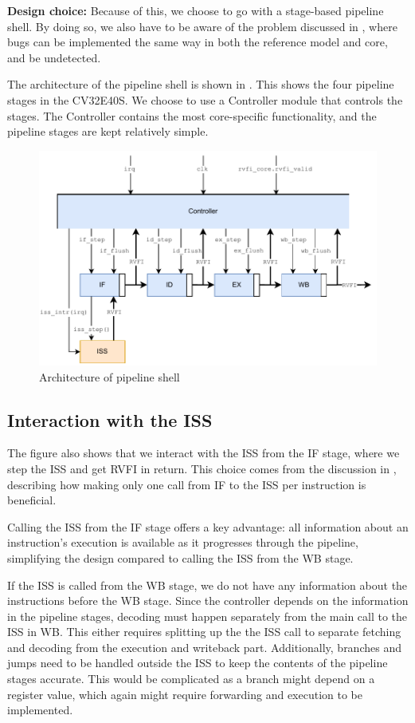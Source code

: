 \textbf{Design choice:} Because of this, we choose to go with a stage-based pipeline shell. By doing so, we also have to be aware of the problem discussed in , where bugs can be implemented the same way in both the reference model and core, and be undetected.

The architecture of the pipeline shell is shown in . This shows the four pipeline stages in the CV32E40S. We choose to use a Controller module that controls the stages. The Controller contains the most core-specific functionality, and the pipeline stages are kept relatively simple. 



\begin{figure}
    \centering
    \includegraphics[width=0.75\linewidth]{figures/Pipeline_shell.pdf}
    \caption{Architecture of pipeline shell}
    \label{fig:pipeline_shell}
\end{figure}

\subsection{Interaction with the ISS}

The figure also shows that we interact with the ISS from the IF stage, where we step the ISS and get RVFI in return. This choice comes from the discussion in , describing how making only one call from IF to the ISS per instruction is beneficial.

Calling the ISS from the IF stage offers a key advantage: all information about an instruction's execution is available as it progresses through the pipeline, simplifying the design compared to calling the ISS from the WB stage. 

If the ISS is called from the WB stage, we do not have any information about the instructions before the WB stage. Since the controller depends on the information in the pipeline stages, decoding must happen separately from the main call to the ISS in WB. This either requires splitting up the the ISS call to separate fetching and decoding from the execution and writeback part. Additionally, branches and jumps need to be handled outside the ISS to keep the contents of the pipeline stages accurate. This would be complicated as a branch might depend on a register value, which again might require forwarding and execution to be implemented.

